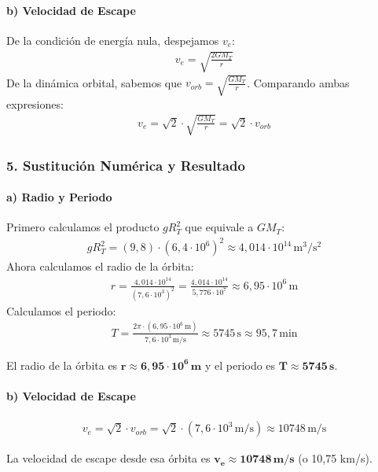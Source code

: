 \paragraph*{b) Velocidad de Escape}
De la condición de energía nula, despejamos $v_e$:
\begin{gather}
    v_e = \sqrt{\frac{2GM_T}{r}}
\end{gather}
De la dinámica orbital, sabemos que $v_{orb} = \sqrt{\frac{GM_T}{r}}$. Comparando ambas expresiones:
\begin{gather}
    v_e = \sqrt{2} \cdot \sqrt{\frac{GM_T}{r}} = \sqrt{2} \cdot v_{orb}
\end{gather}

\subsubsection*{5. Sustitución Numérica y Resultado}
\paragraph*{a) Radio y Periodo}
Primero calculamos el producto $g R_T^2$ que equivale a $GM_T$:
\begin{gather}
    g R_T^2 = (9,8) \cdot (6,4 \cdot 10^6)^2 \approx 4,014 \cdot 10^{14} \, \text{m}^3/\text{s}^2
\end{gather}
Ahora calculamos el radio de la órbita:
\begin{gather}
    r = \frac{4,014 \cdot 10^{14}}{(7,6 \cdot 10^3)^2} = \frac{4,014 \cdot 10^{14}}{5,776 \cdot 10^7} \approx 6,95 \cdot 10^6 \, \text{m}
\end{gather}
Calculamos el periodo:
\begin{gather}
    T = \frac{2\pi \cdot (6,95 \cdot 10^6 \, \text{m})}{7,6 \cdot 10^3 \, \text{m/s}} \approx 5745 \, \text{s} \approx 95,7 \, \text{min}
\end{gather}
\begin{cajaresultado}
    El radio de la órbita es $\boldsymbol{r \approx 6,95 \cdot 10^6 \, \textbf{m}}$ y el periodo es $\boldsymbol{T \approx 5745 \, \textbf{s}}$.
\end{cajaresultado}
\paragraph*{b) Velocidad de Escape}
\begin{gather}
    v_e = \sqrt{2} \cdot v_{orb} = \sqrt{2} \cdot (7,6 \cdot 10^3 \, \text{m/s}) \approx 10748 \, \text{m/s}
\end{gather}
\begin{cajaresultado}
    La velocidad de escape desde esa órbita es $\boldsymbol{v_e \approx 10748 \, \textbf{m/s}}$ (o 10,75 km/s).
\end{cajaresultado}

